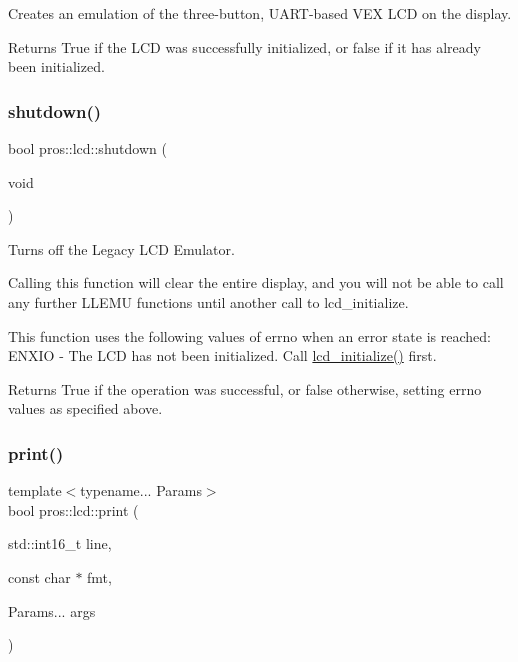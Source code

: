 Creates an emulation of the three-\/button, U\+A\+R\+T-\/based V\+EX L\+CD on the display. 

\begin{DoxyReturn}{Returns}
True if the L\+CD was successfully initialized, or false if it has already been initialized. 
\end{DoxyReturn}
\mbox{\label{namespacepros_1_1lcd_a7aa9a422049011de193f54bce8cc95ed}} 
\subsubsection{\texorpdfstring{shutdown()}{shutdown()}}
{\footnotesize\ttfamily bool pros\+::lcd\+::shutdown (\begin{DoxyParamCaption}\item[{void}]{ }\end{DoxyParamCaption})}



Turns off the Legacy L\+CD Emulator. 

Calling this function will clear the entire display, and you will not be able to call any further L\+L\+E\+MU functions until another call to lcd\+\_\+initialize.

This function uses the following values of errno when an error state is reached\+: E\+N\+X\+IO -\/ The L\+CD has not been initialized. Call \hyperlink{llemu_8h_ae618494f080e95b506c0c18cb1ffb407}{lcd\+\_\+initialize()} first.

\begin{DoxyReturn}{Returns}
True if the operation was successful, or false otherwise, setting errno values as specified above. 
\end{DoxyReturn}
\mbox{\label{namespacepros_1_1lcd_aead67d10b420308d58883135f0d28099}} 
\subsubsection{\texorpdfstring{print()}{print()}}
{\footnotesize\ttfamily template$<$typename... Params$>$ \\
bool pros\+::lcd\+::print (\begin{DoxyParamCaption}\item[{std\+::int16\+\_\+t}]{line,  }\item[{const char $\ast$}]{fmt,  }\item[{Params...}]{args }\end{DoxyParamCaption})}



